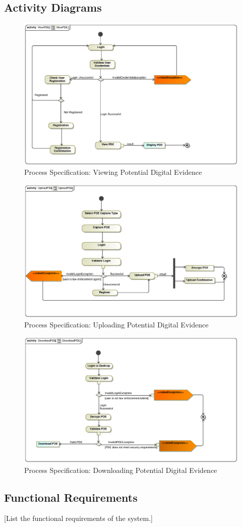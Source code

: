 \documentclass[a4paper,12pt]{article}
\begin{document}
\subsection{Activity Diagrams}
\begin{figure}[H]
\includegraphics[width=\textwidth]{images/ViewPDE.eps}
\caption{Process Specification: Viewing Potential Digital Evidence \label{overflow}}
\end{figure}

\begin{figure}[H]
\includegraphics[width=\textwidth]{images/UploadPDE.eps}
\caption{Process Specification: Uploading Potential Digital Evidence \label{overflow}}
\end{figure}

\begin{figure}[H]
\includegraphics[width=\textwidth]{images/DownloadPDE.eps}
\caption{Process Specification: Downloading Potential Digital Evidence \label{overflow}}
\end{figure}

\subsection{Functional Requirements}
[List the functional requirements of the system.]
\end{document}
